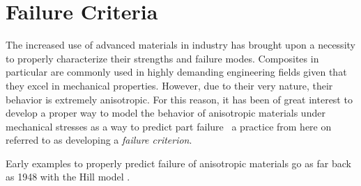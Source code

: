 \documentclass[main.tex]{subfiles}
\begin{document}
\section{Failure Criteria}\label{sec:FC}   
The increased use of advanced materials in industry has brought upon a necessity to properly characterize their strengths and failure modes. Composites in particular are commonly used in highly demanding engineering fields given that they excel in mechanical properties. However, due to their very nature, their behavior is extremely anisotropic. For this reason, it has been of great interest to develop a proper way to model the behavior of anisotropic materials under mechanical stresses as a way to predict part failure \textendash~a practice from here on referred to as developing a \emph{failure criterion}. 

Early examples to properly predict failure of anisotropic materials go as far back as 1948 with the Hill model \cite{Osswald2017a}.


% 
%
%

\end{document}
